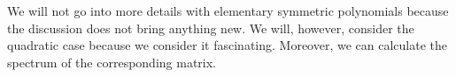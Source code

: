 We will not go into more details with elementary symmetric polynomials because the discussion does not bring anything new.  We will, however, consider the quadratic case because we consider it fascinating.
Moreover, we can calculate the spectrum of the corresponding matrix.




